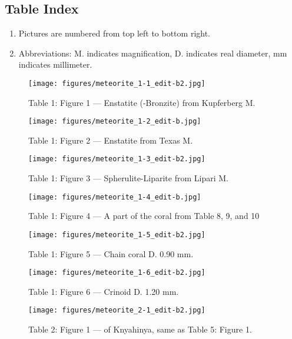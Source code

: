 \documentclass[a4paper, 12pt, oneside]{article}
\begin{document}
\subsection{Table Index}
\begin{enumerate}
    \item Pictures are numbered from top left to bottom right.
    \item Abbreviations: M. indicates magnification, D. indicates real diameter, mm indicates millimeter.
\end{enumerate}
\clearpage
\pagestyle{fancy}
\fancyhf{}
\cfoot{\thepage}
\begin{figure}[b]
\texttt{[image: figures/meteorite\_1-1\_edit-b2.jpg]}
\caption{Table 1: Figure 1 --- Enstatite (-Bronzite) from Kupferberg M.}
\centering
\end{figure}
\clearpage
\begin{figure}[t]
\texttt{[image: figures/meteorite\_1-2\_edit-b.jpg]}
\caption{Table 1: Figure 2 --- Enstatite from Texas M.}
\centering
\end{figure}
\clearpage
\begin{figure}[t]
\texttt{[image: figures/meteorite\_1-3\_edit-b2.jpg]}
\caption{Table 1: Figure 3 --- Spherulite-Liparite from Lipari M.}
\centering
\end{figure}
\clearpage
\begin{figure}[t]
\texttt{[image: figures/meteorite\_1-4\_edit-b.jpg]}
\caption{Table 1: Figure 4 --- A part of the coral from Table 8, 9, and 10}
\centering
\end{figure}
\clearpage
\begin{figure}[t]
\texttt{[image: figures/meteorite\_1-5\_edit-b2.jpg]}
\caption{Table 1: Figure 5 --- Chain coral D. 0.90 mm.}
\centering
\end{figure}
\clearpage
\begin{figure}[t]
\texttt{[image: figures/meteorite\_1-6\_edit-b2.jpg]}
\caption{Table 1: Figure 6 --- Crinoid D. 1.20 mm.}
\centering
\end{figure}
\clearpage
{}
\begin{figure}[t]
\texttt{[image: figures/meteorite\_2-1\_edit-b2.jpg]}
\caption{Table 2: Figure 1 --- of Knyahinya, same as Table 5: Figure 1.}
\centering
\end{figure}
\end{document}
